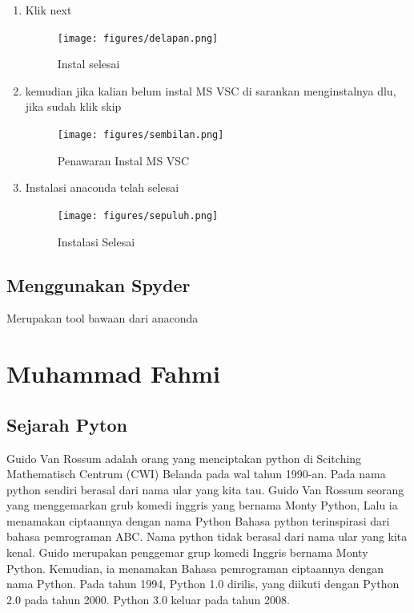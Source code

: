 \begin{enumerate}
    \item Klik next
    \begin{figure}[!htbp]
        \centering
        \texttt{[image: figures/delapan.png]}
        \caption{Instal selesai}
        \label{Proses}
        \end{figure}

    \item kemudian jika kalian belum instal MS VSC di sarankan menginstalnya dlu, jika sudah klik skip
    \begin{figure}[!htbp]
        \centering
        \texttt{[image: figures/sembilan.png]}
        \caption{Penawaran Instal MS VSC}
        \label{offering}
        \end{figure}

    \item Instalasi anaconda telah selesai
    \begin{figure}[!htbp]
        \centering
        \texttt{[image: figures/sepuluh.png]}
        \caption{Instalasi Selesai}
        \label{akhir}
        \end{figure}
\end{enumerate}
\subsection{Menggunakan Spyder}
Merupakan tool bawaan dari anaconda


\section{Muhammad Fahmi}

\subsection{Sejarah Pyton}
Guido Van Rossum adalah orang yang menciptakan python di Scitching Mathematisch Centrum (CWI) Belanda pada wal tahun 1990-an.
Pada nama python sendiri berasal dari nama ular yang kita tau. Guido Van Rossum seorang yang menggemarkan grub komedi inggris yang bernama Monty Python, Lalu ia menamakan ciptaannya dengan nama Python
Bahasa python terinspirasi dari bahasa pemrograman ABC. Nama python tidak berasal dari nama ular yang kita kenal. Guido merupakan penggemar grup komedi Inggris bernama Monty Python. Kemudian, ia menamakan Bahasa pemrograman ciptaannya dengan nama Python.
Pada tahun 1994, Python 1.0 dirilis, yang diikuti dengan Python 2.0 pada tahun 2000. Python 3.0 keluar pada tahun 2008.


